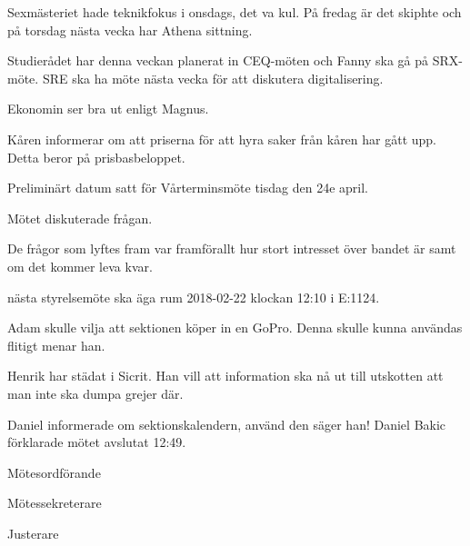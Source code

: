 \documentclass[10pt]{article}
\def\mo{Daniel Bakic}
\def\ms{Axel Voss}
\def\ji{Malin Heyden}
\begin{document}
\begin{paragrafer}
\begin{paragrafer}
Sexmästeriet hade teknikfokus i onsdags, det va kul. På fredag är det skiphte och på torsdag nästa vecka har Athena sittning.

Studierådet har denna veckan planerat in CEQ-möten och Fanny ska gå på SRX-möte. SRE ska ha möte nästa vecka för att diskutera digitalisering.

  Ekonomin ser bra ut enligt Magnus.

Kåren informerar om att priserna för att hyra saker från kåren har gått upp. Detta beror på prisbasbeloppet.
\end{paragrafer}


Preliminärt datum satt för Vårterminsmöte tisdag den 24e april.

Mötet diskuterade frågan.

De frågor som lyftes fram var framförallt hur stort intresset över bandet är samt om det kommer leva kvar.

\Mba nästa styrelsemöte ska äga rum 2018-02-22 klockan 12:10 i E:1124.


\Ibfu

Adam skulle vilja att sektionen köper in en GoPro. Denna skulle kunna användas flitigt menar han.

Henrik har städat i Sicrit. Han vill att information ska nå ut till utskotten att man inte ska dumpa grejer där.

Daniel informerade om sektionskalendern, använd den säger han!
{\mo} förklarade mötet avslutat 12:49.
\end{paragrafer}

\hidesignfoot
\begin{signatures}{3}
\signature{\mo}{Mötesordförande}
\signature{\ms}{Mötessekreterare}
\signature{\ji}{Justerare}
\end{signatures}
\end{document}

